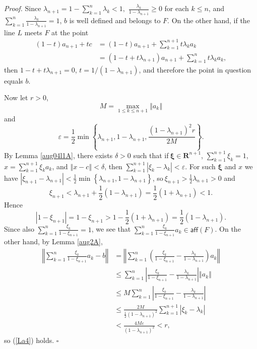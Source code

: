 \documentclass[11pt]{article}%
\newenvironment{proof}[1][Proof]{\noindent\textit{#1.} }{}
\begin{document}
\begin{proof}
Since $\lambda_{n+1}=1-\sum_{k=1}^{n}\lambda_{k}<1,$ $\frac{\lambda_{k}%
}{1-\lambda_{n+1}}\geq0$ for each $k\leq n$, and $\sum_{k=1}^{n}\frac
{\lambda_{k}}{1-\lambda_{n+1}}=1$, $b$ is well defined and belongs to $F$. On
the other hand, if the line $L$ meets $F$ at the point%
\begin{align*}
\left(  1-t\right)  a_{n+1}+tc  &  =\left(  1-t\right)  a_{n+1}+\sum
_{k=1}^{n+1}t\lambda_{k}a_{k}\\
&  =\left(  1-t+t\lambda_{n+1}\right)  a_{n+1}+\sum_{k=1}^{n}t\lambda_{k}%
a_{k},
\end{align*}
then $1-t+t\lambda_{n+1}=0$, $t=1/(1-\lambda_{n+1})$, and therefore the point
in question equals $b$.

Now let $r>0$,%
\[
M=\max_{1\leq k\leq n+1}\left\Vert a_{k}\right\Vert
\]
and%
\[
\varepsilon=\frac{1}{2}\min\left\{  \lambda_{n+1},1-\lambda_{n+1}%
,\frac{\left(  1-\lambda_{n+1}\right)  ^{2}r}{2M}\right\}  .
\]
By Lemma \ref{aug04l1A}, there exists $\delta>0$ such that if$\ \mathbf{\xi
}\in\mathbf{R}^{n+1}$, $\sum_{k=1}^{n+1}\xi_{k}=1$, $x=\sum_{k=1}^{n+1}\xi
_{k}a_{k}$, and $\left\Vert x-c\right\Vert <\delta$, then $\sum_{k=1}%
^{n+1}\left\vert \xi_{k}-\lambda_{k}\right\vert <\varepsilon$. For such
$\mathbf{\xi}$ and $x$ we have $\left\vert \xi_{n+1}-\lambda_{n+1}\right\vert
<\frac{1}{2}\min\left\{  \lambda_{n+1},1-\lambda_{n+1}\right\}  $,
so$\ \xi_{n+1}>\frac{1}{2}\lambda_{n+1}>0$ and%
\[
\xi_{n+1}<\lambda_{n+1}+\frac{1}{2}\left(  1-\lambda_{n+1}\right)  =\frac
{1}{2}(1+\lambda_{n+1})<1.
\]
Hence%
\[
\left\vert 1-\xi_{n+1}\right\vert =1-\xi_{n+1}>1-\frac{1}{2}(1+\lambda
_{n+1})=\frac{1}{2}(1-\lambda_{n+1})\text{.}%
\]
Since also $\sum_{k=1}^{n}\frac{\xi_{k}}{1-\xi_{n+1}}=1$, we see that
$\sum_{k=1}^{n}\frac{\xi_{k}}{1-\xi_{n+1}}a_{k}\in\mathsf{aff}(F)$. On the
other hand, by Lemma \ref{aug2A},%
\begin{align*}
\left\Vert \sum_{k=1}^{n}\frac{\xi_{k}}{1-\xi_{n+1}}a_{k}-b\right\Vert  &
=\left\Vert \sum_{k=1}^{n}\left(  \frac{\xi_{k}}{1-\xi_{n+1}}-\frac
{\lambda_{k}}{1-\lambda_{n+1}}\right)  a_{k}\right\Vert \\
&  \leq\sum_{k=1}^{n}\left\vert \frac{\xi_{k}}{1-\xi_{n+1}}-\frac{\lambda_{k}%
}{1-\lambda_{n+1}}\right\vert \left\Vert a_{k}\right\Vert \\
&  \leq M\sum_{k=1}^{n}\left\vert \frac{\xi_{k}}{1-\xi_{n+1}}-\frac
{\lambda_{k}}{1-\lambda_{n+1}}\right\vert \\
&  \leq\frac{2M}{\frac{1}{2}\left(  1-\lambda_{n+1}\right)  ^{2}}\sum
_{k=1}^{n+1}\left\vert \xi_{k}-\lambda_{k}\right\vert \\
&  <\frac{4M\varepsilon}{\left(  1-\lambda_{n+1}\right)  ^{2}}<r,
\end{align*}
so (\ref{La4}) holds.%
\hfill
$\square$
\end{proof}
\end{document}

